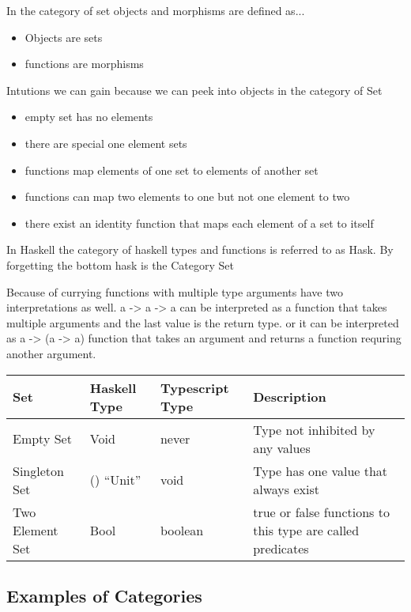 \documentclass[12pt, letterpaper]{article}
\begin{document}
\begingroup
In the category of set objects and morphisms are defined as...
\begin{itemize}
\item Objects are sets
\item functions are morphisms
\end{itemize}
\endgroup

\begingroup
Intutions we can gain because we can peek into objects in the category of Set
\begin{itemize}
  \item empty set has no elements
  \item there are special one element sets
  \item functions map elements of one set to elements of another set
  \item functions can map two elements to one but not one element to two
  \item there exist an identity function that maps each element of a set to itself
\end{itemize}

In Haskell the category of haskell types and functions is referred to as Hask. By forgetting the bottom hask is the Category Set

Because of currying functions with multiple type arguments have two interpretations as well. a -> a -> a can be interpreted as a function that takes multiple arguments and the last value is the return type. or it can be interpreted as a -> (a -> a) function that takes an argument and returns a function requring another argument. 

 \begin{tabularx}{\textwidth} { 
  | >{\centering\arraybackslash}X 
  | >{\centering\arraybackslash}X 
  | >{\centering\arraybackslash}X 
  | >{\centering\arraybackslash}X | }
\hline
Set & Haskell Type & Typescript Type & Description \\ 
\hline
Empty Set & Void & never & Type not inhibited by any values \\
\hline
Singleton Set & () ``Unit'' & void & Type has one value that always exist \\
\hline
Two Element Set & Bool & boolean & true or false functions to this type are called predicates \\
\hline
\end{tabularx}

\endgroup

\subsection{Examples of Categories}
\end{document}
